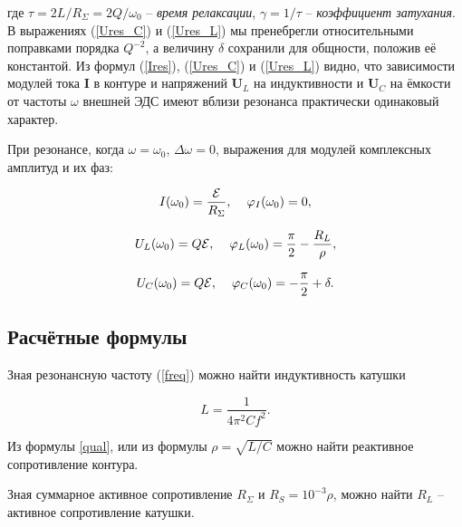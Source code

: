 \documentclass[a4paper, 12pt]{article}
\begin{document}
    где $\tau = 2L/R_\Sigma = 2Q/\omega_0$ -- \textit{время релаксации}, $\gamma = 1/\tau$ -- \textit{коэффициент затухания}. В выражениях (\ref{Ures_C}) и (\ref{Ures_L}) мы пренебрегли относительными поправками порядка $Q^{-2}$, а величину $\delta$ сохранили для общности, положив её константой. Из формул (\ref{Ires}), (\ref{Ures_C}) и (\ref{Ures_L}) видно, что зависимости модулей тока $\bm{I}$ в контуре и напряжений $\bm{U}_L$ на индуктивности и $\bm{U}_C$ на ёмкости от частоты $\omega$ внешней ЭДС имеют вблизи резонанса практически одинаковый характер.

    При резонансе, когда $\omega = \omega_0$, $\Delta \omega = 0$, выражения для модулей комплексных амплитуд и их фаз:

    \begin{equation}
        I(\omega_0) = \frac{\mathcal{E}}{R_\Sigma}, \hspace{4mm} \varphi_I(\omega_0) = 0,
    \end{equation}

    \begin{equation}
        U_L(\omega_0) = Q\mathcal{E}, \hspace{4mm} \varphi_L(\omega_0) = \frac{\pi}{2} - \frac{R_L}{\rho},
    \end{equation}

    \begin{equation}
        \label{resc}
        U_C(\omega_0) = Q\mathcal{E}, \hspace{4mm} \varphi_C(\omega_0) = -\frac{\pi}{2} + \delta.
    \end{equation}

    \subsection{Расчётные формулы}

    Зная резонансную частоту (\eqref{freq}) можно найти индуктивность катушки
    
    \begin{equation}
    \label{induct}
        L = \frac{1}{4 \pi ^2 C f^2}.
    \end{equation}
    
     Из формулы \eqref{qual}, или из формулы $ \rho = \sqrt{L/C} $ можно найти реактивное сопротивление контура. 
     
     Зная суммарное активное сопротивление $R_\Sigma$ и $R_S = 10^{-3} \rho$, можно найти $R_L$ -- активное сопротивление катушки. 
     
\end{document}
